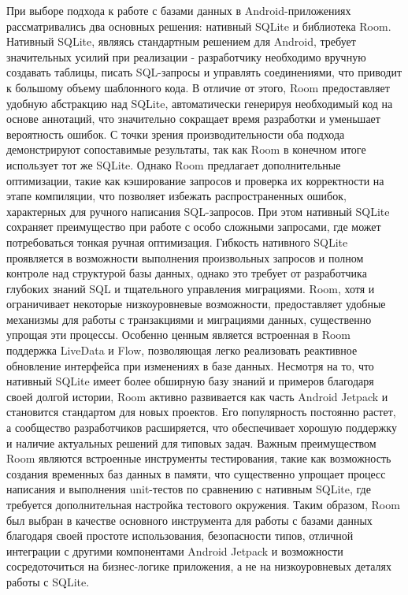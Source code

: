 \documentclass{vsureport}
\begin{document}
При выборе подхода к работе с базами данных в Android-приложениях рассматривались два основных решения: нативный SQLite и библиотека Room. Нативный SQLite, являясь стандартным решением для Android, требует значительных усилий при реализации - разработчику необходимо вручную создавать таблицы, писать SQL-запросы и управлять соединениями, что приводит к большому объему шаблонного кода. В отличие от этого, Room предоставляет удобную абстракцию над SQLite, автоматически генерируя необходимый код на основе аннотаций, что значительно сокращает время разработки и уменьшает вероятность ошибок.
С точки зрения производительности оба подхода демонстрируют сопоставимые результаты, так как Room в конечном итоге использует тот же SQLite. Однако Room предлагает дополнительные оптимизации, такие как кэширование запросов и проверка их корректности на этапе компиляции, что позволяет избежать распространенных ошибок, характерных для ручного написания SQL-запросов. При этом нативный SQLite сохраняет преимущество при работе с особо сложными запросами, где может потребоваться тонкая ручная оптимизация.
Гибкость нативного SQLite проявляется в возможности выполнения произвольных запросов и полном контроле над структурой базы данных, однако это требует от разработчика глубоких знаний SQL и тщательного управления миграциями. Room, хотя и ограничивает некоторые низкоуровневые возможности, предоставляет удобные механизмы для работы с транзакциями и миграциями данных, существенно упрощая эти процессы. Особенно ценным является встроенная в Room поддержка LiveData и Flow, позволяющая легко реализовать реактивное обновление интерфейса при изменениях в базе данных.
Несмотря на то, что нативный SQLite имеет более обширную базу знаний и примеров благодаря своей долгой истории, Room активно развивается как часть Android Jetpack и становится стандартом для новых проектов. Его популярность постоянно растет, а сообщество разработчиков расширяется, что обеспечивает хорошую поддержку и наличие актуальных решений для типовых задач.
Важным преимуществом Room являются встроенные инструменты тестирования, такие как возможность создания временных баз данных в памяти, что существенно упрощает процесс написания и выполнения unit-тестов по сравнению с нативным SQLite, где требуется дополнительная настройка тестового окружения.
Таким образом, Room был выбран в качестве основного инструмента для работы с базами данных благодаря своей простоте использования, безопасности типов, отличной интеграции с другими компонентами Android Jetpack и возможности сосредоточиться на бизнес-логике приложения, а не на низкоуровневых деталях работы с SQLite.\cite{ref3}
\end{document}
